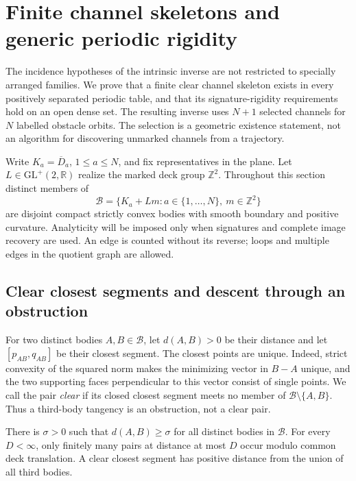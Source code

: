 \section{Finite channel skeletons and generic periodic rigidity}
\label{sec:v45-generic-rigidity}

The incidence hypotheses of the intrinsic inverse are not restricted to
specially arranged families.  We prove that a finite clear channel skeleton
exists in every positively separated periodic table, and that its
signature-rigidity requirements hold on an open dense set.  The resulting
inverse uses $N+1$ selected channels for $N$ labelled obstacle orbits.  The
selection is a geometric existence statement, not an algorithm for discovering
unmarked channels from a trajectory.

Write $K_a=\overline D_a$, $1\le a\le N$, and fix representatives in the
plane.  Let $L\in\mathrm{GL}^+(2,\mathbb R)$ realize the marked deck group
$\mathbb Z^2$.  Throughout this section distinct members of
\[
 \mathscr B=\{K_a+Lm:a\in\{1,\ldots,N\},\ m\in\mathbb Z^2\}
\]
are disjoint compact strictly convex bodies with smooth boundary and positive
curvature.  Analyticity will be imposed only when signatures and complete
image recovery are used.  An edge is counted without its reverse; loops and
multiple edges in the quotient graph are allowed.

\subsection{Clear closest segments and descent through an obstruction}

For two distinct bodies $A,B\in\mathscr B$, let $d(A,B)>0$ be their distance
and let $[p_{AB},q_{AB}]$ be their closest segment.  The closest points are
unique.  Indeed, strict convexity of the squared norm makes the minimizing
vector in $B-A$ unique, and the two supporting faces perpendicular to this
vector consist of single points.  We call the pair \emph{clear} if its closed
closest segment meets no member of $\mathscr B\setminus\{A,B\}$.  Thus a
third-body tangency is an obstruction, not a clear pair.

\begin{lemma}
\label{lem:v45-finite-sublevels}
There is $\sigma>0$ such that $d(A,B)\ge\sigma$ for all distinct bodies in
$\mathscr B$.  For every $D<\infty$, only finitely many pairs at distance at
most $D$ occur modulo common deck translation.  A clear closest segment has
positive distance from the union of all third bodies.
\end{lemma}

